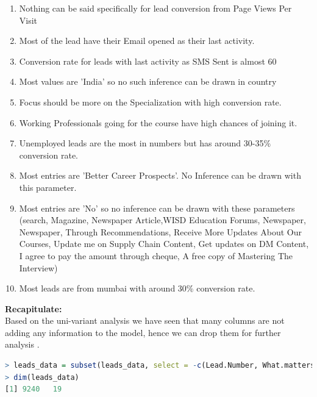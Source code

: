 \begin{enumerate}
\item Nothing can be said specifically for lead conversion from Page Views Per Visit
\item Most of the lead have their Email opened as their last activity.
\item Conversion rate for leads with last activity as SMS Sent is almost 60%
\item Most values are 'India'  so no such inference can be drawn in country
\item Focus should be more on the Specialization with high conversion rate.
\item Working Professionals going for the course have high chances of joining it.
\item Unemployed leads are the most in numbers but has around 30-35\% conversion rate.
\item Most entries are 'Better Career Prospects'. No Inference can be drawn with this parameter.
\item Most entries are 'No' so no inference can be drawn with these parameters (search, Magazine, Newspaper Article,WISD Education Forums, Newspaper, Newspaper, Through Recommendations, Receive More Updates About Our Courses, Update me on Supply Chain Content, Get updates on DM Content, I agree to pay the amount through cheque, A free copy of Mastering The Interview) 
\item Most leads are from mumbai with around 30\% conversion rate.
\end{enumerate}
\textbf{Recapitulate: }\\
Based on the uni-variant analysis we have seen that many columns are not adding any information to the model, hence we can drop them for further analysis .
\begin{lstlisting}[language=R]
> leads_data = subset(leads_data, select = -c(Lead.Number, What.matters.most.to.you.in.choosing.a.course, Search, Newspaper.Article, WISD.Forums,Newspaper,Digital.Advertisement, Through.Recommendations, Receive.More.Updates.About.Our.Courses, Update.me.on.Supply.Chain.Content,Get.updates.on.DM.Content, I.agree.to.pay.the.amount.through.cheque,A.free.copy.of.Mastering.The.Interview, Country))
> dim(leads_data)
[1] 9240   19
\end{lstlisting}



